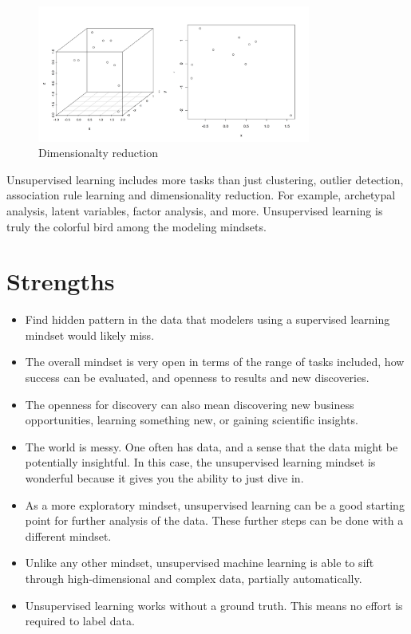 \documentclass[
  10pt,
]{scrbook}
\providecommand{\tightlist}{%
  \setlength{\itemsep}{0pt}\setlength{\parskip}{0pt}}
\begin{document}
\begin{figure}

{\centering \includegraphics[width=0.8\textwidth]{figures/dimred-1} 

}

\caption{Dimensionalty reduction}\label{fig:dimred}
\end{figure}

Unsupervised learning includes more tasks than just clustering, outlier detection, association rule learning and dimensionality reduction.
For example, archetypal analysis, latent variables, factor analysis, and more.
Unsupervised learning is truly the colorful bird among the modeling mindsets.

\hypertarget{strengths-7}{%
\section{Strengths}\label{strengths-7}}

\begin{itemize}
\tightlist
\item
  Find hidden pattern in the data that modelers using a supervised learning mindset would likely miss.
\item
  The overall mindset is very open in terms of the range of tasks included, how success can be evaluated, and openness to results and new discoveries.
\item
  The openness for discovery can also mean discovering new business opportunities, learning something new, or gaining scientific insights.
\item
  The world is messy. One often has data, and a sense that the data might be potentially insightful. In this case, the unsupervised learning mindset is wonderful because it gives you the ability to just dive in.
\item
  As a more exploratory mindset, unsupervised learning can be a good starting point for further analysis of the data. These further steps can be done with a different mindset.
\item
  Unlike any other mindset, unsupervised machine learning is able to sift through high-dimensional and complex data, partially automatically.
\item
  Unsupervised learning works without a ground truth. This means no effort is required to label data.
\end{itemize}
\end{document}
